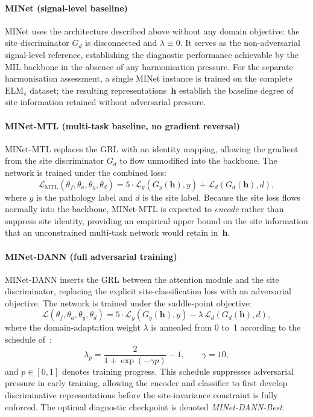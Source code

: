 \documentclass[preprint,12pt]{elsarticle}
\begin{document}
\paragraph{MINet (signal-level baseline)}
MINet uses the architecture described above without any domain
objective: the site discriminator $G_d$ is disconnected and
$\lambda \equiv 0$.
It serves as the non-adversarial signal-level reference,
establishing the diagnostic performance achievable by the MIL
backbone in the absence of any harmonisation pressure.
For the separate harmonisation assessment, a single MINet instance
is trained on the complete $\mathrm{ELM}_s$ dataset; the
resulting representations~$\mathbf{h}$ establish the baseline
degree of site information retained without adversarial pressure.

\paragraph{MINet-MTL (multi-task baseline, no gradient reversal)}
MINet-MTL replaces the GRL with an identity mapping, allowing the
gradient from the site discriminator $G_d$ to flow unmodified
into the backbone.
The network is trained under the combined loss:
\begin{equation}
    \mathcal{L}_{\mathrm{MTL}}(\theta_f,\theta_a,\theta_y,\theta_d)
    = 5\cdot\mathcal{L}_y\!\left(G_y(\mathbf{h}),y\right)
      + \mathcal{L}_d\!\left(G_d(\mathbf{h}),d\right),
\end{equation}
where $y$ is the pathology label and $d$ is the site label.
Because the site loss flows normally into the backbone, MINet-MTL
is expected to \emph{encode} rather than suppress site identity,
providing an empirical upper bound on the site information that
an unconstrained multi-task network would retain in~$\mathbf{h}$.

\paragraph{MINet-DANN (full adversarial training)}
MINet-DANN inserts the GRL between the attention module and the
site discriminator, replacing the explicit site-classification
loss with an adversarial objective.
The network is trained under the saddle-point objective:
\begin{equation}
    \mathcal{L}(\theta_f,\theta_a,\theta_y,\theta_d)
    = 5\cdot\mathcal{L}_y\!\left(G_y(\mathbf{h}),y\right)
      - \lambda\,\mathcal{L}_d\!\left(G_d(\mathbf{h}),d\right),
\end{equation}
where the domain-adaptation weight $\lambda$ is annealed from 0
to~1 according to the schedule of~\cite{ganin2016domain}:
\begin{equation}
    \lambda_p = \frac{2}{1+\exp(-\gamma p)} - 1,
    \qquad \gamma = 10,
    \label{eq:lambda_schedule}
\end{equation}
and $p \in [0,1]$ denotes training progress.
This schedule suppresses adversarial pressure in early training,
allowing the encoder and classifier to first develop
discriminative representations before the site-invariance
constraint is fully enforced.
The optimal diagnostic checkpoint is denoted
\emph{MINet-DANN-Best}.
\end{document}
